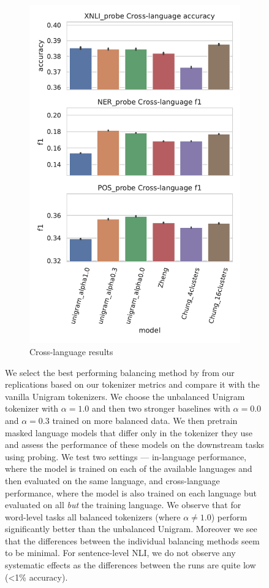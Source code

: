 \begin{figure}
\begin{subfigure}{.5\textwidth}
      \centering
      \includegraphics[width=\linewidth]{figures/probe_overall_crosslanguage.pdf}
      \caption{Cross-language results}
      \label{fig:probe_overall_crosslanguage}
    \end{subfigure}
    \caption{We select the best performing balancing method by \citet{chung_improving_2020} from our replications based on our tokenizer metrics and compare it with the vanilla Unigram tokenizers. We choose the unbalanced Unigram tokenizer with $\alpha=1.0$ and then two stronger baselines with $\alpha=0.0$ and $\alpha=0.3$ trained on more balanced data. We then pretrain masked language models that differ only in the tokenizer they use and assess the performance of these models on the downstream tasks using probing. We test two settings --- in-language performance, where the model is trained on each of the available languages and then evaluated on the same language, and cross-language performance, where the model is also trained on each language but evaluated on all \textit{but} the training language. We observe that for word-level tasks all balanced tokenizers (where $\alpha\neq1.0$) perform significantly better than the unbalanced Unigram. Moreover we see that the differences between the individual balancing methods seem to be minimal. For sentence-level NLI, we do not observe any systematic effects as the differences between the runs are quite low (<1\% accuracy).
}
\end{figure}
